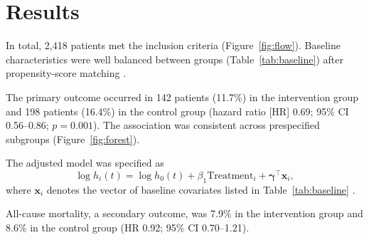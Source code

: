 \section{Results}
\label{sec:results}

In total, 2,418 patients met the inclusion criteria (Figure~\ref{fig:flow}). Baseline characteristics were well balanced between groups (Table~\ref{tab:baseline}) after propensity-score matching \cite{austin2011introduction}.

The primary outcome occurred in 142 patients (11.7\%) in the intervention group and 198 patients (16.4\%) in the control group (hazard ratio [HR] 0.69; 95\% CI 0.56--0.86; $p = 0.001$). The association was consistent across prespecified subgroups (Figure~\ref{fig:forest}).

The adjusted model was specified as
\begin{equation}
  \log h_i(t) = \log h_0(t) + \beta_1 \text{Treatment}_i + \boldsymbol{\gamma}^\top \mathbf{x}_i ,
  \label{eq:cox}
\end{equation}
where $\mathbf{x}_i$ denotes the vector of baseline covariates listed in Table~\ref{tab:baseline} \cite{cox1972regression, therneau2000modeling}.

All-cause mortality, a secondary outcome, was 7.9\% in the intervention group and 8.6\% in the control group (HR 0.92; 95\% CI 0.70--1.21).
